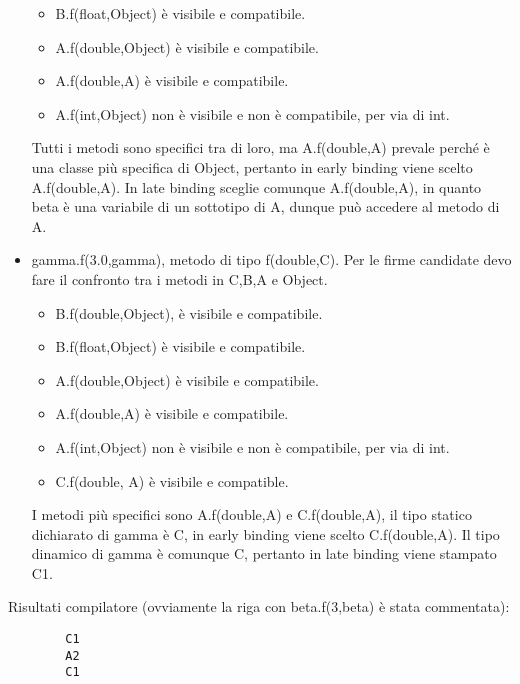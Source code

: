 \begin{itemize}
\begin{itemize}
            \item B.f(float,Object) è visibile e compatibile.
            \item A.f(double,Object) è visibile e compatibile.
            \item A.f(double,A) è visibile e compatibile.
            \item A.f(int,Object) non è visibile e non è compatibile, per via di int.
        \end{itemize}
        Tutti i metodi sono specifici tra di loro, ma A.f(double,A) prevale perché è una classe più
        specifica di Object, pertanto in early binding viene scelto A.f(double,A). In late binding
        sceglie comunque A.f(double,A), in quanto beta è una variabile di un sottotipo di A, dunque 
        può accedere al metodo di A.
        \item gamma.f(3.0,gamma), metodo di tipo f(double,C). Per le firme candidate devo fare il confronto
        tra i metodi in C,B,A e Object.
        \begin{itemize}
            \item B.f(double,Object), è visibile e compatibile.
            \item B.f(float,Object) è visibile e compatibile.
            \item A.f(double,Object) è visibile e compatibile.
            \item A.f(double,A) è visibile e compatibile.
            \item A.f(int,Object) non è visibile e non è compatibile, per via di int.
            \item C.f(double, A) è visibile e compatible.
        \end{itemize}
        I metodi più specifici sono A.f(double,A) e C.f(double,A), il tipo statico dichiarato di gamma è C,
        in early binding viene scelto C.f(double,A). Il tipo dinamico di gamma è comunque C, pertanto in
        late binding viene stampato C1.
    \end{itemize}
    Risultati compilatore (ovviamente la riga con beta.f(3,beta) è stata commentata):
    \begin{lstlisting}
        C1
        A2
        C1
    \end{lstlisting}
